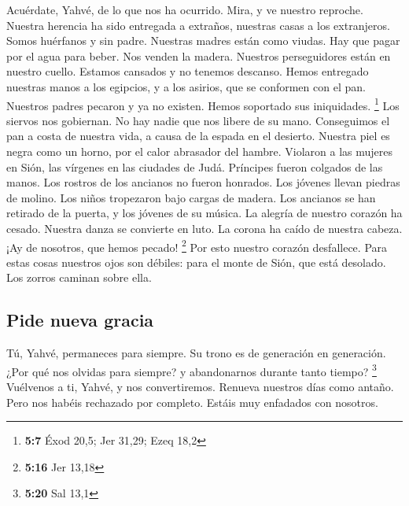  Acuérdate, Yahvé, de lo que nos ha ocurrido. Mira, y ve
nuestro reproche.  Nuestra herencia ha sido entregada a
extraños, nuestras casas a los extranjeros.  Somos
huérfanos y sin padre. Nuestras madres están como viudas. 
Hay que pagar por el agua para beber. Nos venden la madera.
 Nuestros perseguidores están en nuestro cuello. Estamos
cansados y no tenemos descanso.  Hemos entregado nuestras
manos a los egipcios, y a los asirios, que se conformen con el pan.
 Nuestros padres pecaron y ya no existen. Hemos soportado
sus iniquidades. \footnote{\textbf{5:7} Éxod 20,5; Jer 31,29; Ezeq 18,2}
 Los siervos nos gobiernan. No hay nadie que nos libere de
su mano.  Conseguimos el pan a costa de nuestra vida, a
causa de la espada en el desierto.  Nuestra piel es negra
como un horno, por el calor abrasador del hambre. 
Violaron a las mujeres en Sión, las vírgenes en las ciudades de Judá.
 Príncipes fueron colgados de las manos. Los rostros de
los ancianos no fueron honrados.  Los jóvenes llevan
piedras de molino. Los niños tropezaron bajo cargas de madera.
 Los ancianos se han retirado de la puerta, y los jóvenes
de su música.  La alegría de nuestro corazón ha cesado.
Nuestra danza se convierte en luto.  La corona ha caído
de nuestra cabeza. ¡Ay de nosotros, que hemos pecado! \footnote{\textbf{5:16}
  Jer 13,18}  Por esto nuestro corazón desfallece. Para
estas cosas nuestros ojos son débiles:  para el monte de
Sión, que está desolado. Los zorros caminan sobre ella.

\hypertarget{pide-nueva-gracia}{%
\subsection{Pide nueva gracia}\label{pide-nueva-gracia}}

 Tú, Yahvé, permaneces para siempre. Su trono es de
generación en generación.  ¿Por qué nos olvidas para
siempre? y abandonarnos durante tanto tiempo? \footnote{\textbf{5:20}
  Sal 13,1}  Vuélvenos a ti, Yahvé, y nos convertiremos.
Renueva nuestros días como antaño.  Pero nos habéis
rechazado por completo. Estáis muy enfadados con nosotros.
